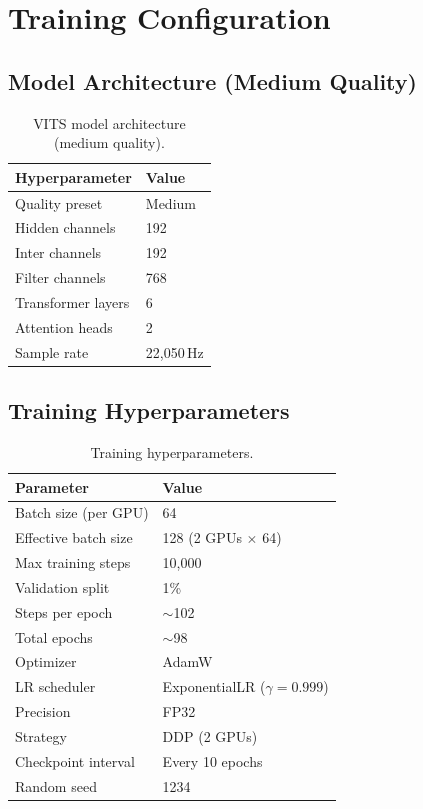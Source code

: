 \documentclass[10pt,a4paper,twocolumn]{article}
\begin{document}
\section{Training Configuration}
\label{sec:config}

\subsection{Model Architecture (Medium Quality)}

\begin{table}[ht]
\centering
\begin{tabular}{@{}ll@{}}
\toprule
Hyperparameter & Value \\
\midrule
Quality preset & Medium \\
Hidden channels & 192 \\
Inter channels & 192 \\
Filter channels & 768 \\
Transformer layers & 6 \\
Attention heads & 2 \\
Sample rate & 22,050\,Hz \\
\bottomrule
\end{tabular}
\caption{VITS model architecture (medium quality).}
\label{tab:arch}
\end{table}

\subsection{Training Hyperparameters}

\begin{table}[ht]
\centering
\begin{tabular}{@{}ll@{}}
\toprule
Parameter & Value \\
\midrule
Batch size (per GPU) & 64 \\
Effective batch size & 128 (2 GPUs $\times$ 64) \\
Max training steps & 10,000 \\
Validation split & 1\% \\
Steps per epoch & $\sim$102 \\
Total epochs & $\sim$98 \\
Optimizer & AdamW \\
LR scheduler & ExponentialLR ($\gamma = 0.999$) \\
Precision & FP32 \\
Strategy & DDP (2 GPUs) \\
Checkpoint interval & Every 10 epochs \\
Random seed & 1234 \\
\bottomrule
\end{tabular}
\caption{Training hyperparameters.}
\label{tab:hparams}
\end{table}
\end{document}
